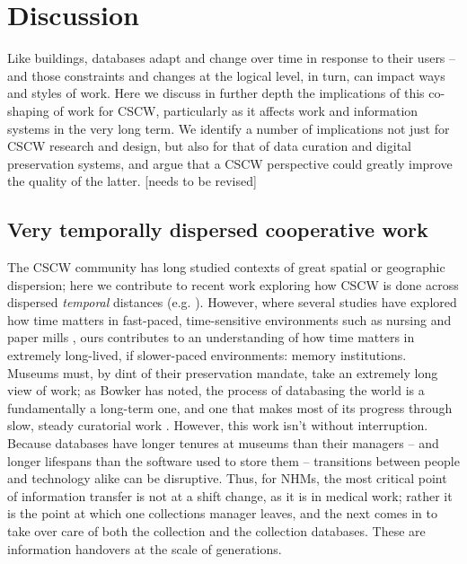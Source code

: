 \section{Discussion}

Like buildings, databases adapt and change over time in response to their users -- and those constraints and changes at the logical level, in turn, can impact ways and styles of work.  Here we discuss in further depth the implications of this co-shaping of work for CSCW, particularly as it affects work and information systems in the very long term. We identify a number of implications not just for CSCW research and design, but also for that of data curation and digital preservation systems, and argue that a CSCW perspective could greatly improve the quality of the latter. [needs to be revised]

\subsection{Very temporally dispersed cooperative work}

The CSCW community has long studied contexts of great spatial or geographic dispersion; here we contribute to recent work exploring how CSCW is done across dispersed \textit{temporal} distances (e.g. \cite{Jackson_2011, Lindley_2015}). However, where several studies have explored how time matters in fast-paced, time-sensitive environments such as nursing \cite{sarcevic2009information, Reddy_2006} and paper mills \cite{auramaki1996paperwork}, ours contributes to an understanding of how time matters in extremely long-lived, if slower-paced environments: memory institutions. Museums must, by dint of their preservation mandate, take an extremely long view of work; as Bowker has noted, the process of databasing the world is a fundamentally a long-term one, and one that makes most of its progress through slow, steady curatorial work \cite{Bowker_2000}. However, this work isn't without interruption. Because databases have longer tenures at museums than their managers -- and longer lifespans than the software used to store them -- transitions between people and technology alike can be disruptive. Thus, for NHMs, the most critical point of information transfer is not at a shift change, as it is in medical work; rather it is the point at which one collections manager leaves, and the next comes in to take over care of both the collection and the collection databases. These are information handovers at the scale of generations.

